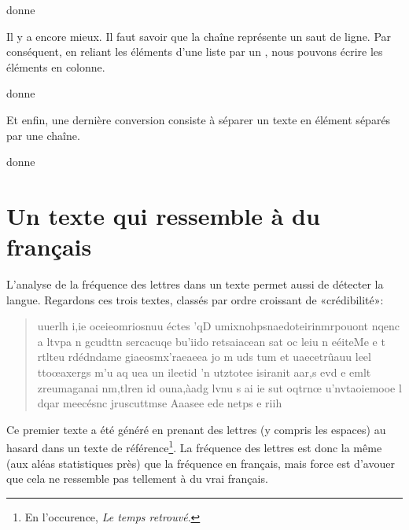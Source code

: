 


donne





Il y a encore mieux. Il faut savoir que la chaîne  représente un saut de ligne. Par conséquent, en reliant les éléments d'une liste par un , nous pouvons écrire les éléments en colonne. 



donne



Et enfin, une dernière conversion consiste à séparer un texte en élément séparés par une chaîne. 



donne





\section{Un texte qui ressemble à du français}

L'analyse de la fréquence des lettres dans un texte permet aussi de détecter la langue. Regardons ces trois textes, classés par ordre croissant de «crédibilité»:

\begin{quote}
    uuerlh i,ie oceieomriosnuu éctes 'qD umixnohpsnaedoteirinmrpouont nqenc a ltvpa n gcudttn  sercacuqe bu'iido retsaiacean sat oc leiu n  eéiteMe e   t  rtlteu rdédndame giaeosmx'raeaeea  jo m uds tum   et uaecetrûauu leel ttoœaxergs m'u aq uea un ileetid 'n utztotee isiranit aar,s evd e emlt zreumaganai nm,tlren id ouna,àadg lvnu s ai ie sut oqtrnœ u'nvtaoiemooe l  dqar meecésnc  jruscuttmse Aaasee ede netps  e riih
\end{quote}
Ce premier texte a été généré en prenant des lettres (y compris les espaces) au hasard dans un texte de référence\footnote{En l'occurence, \emph{Le temps retrouvé}.}. La fréquence des lettres est donc la même (aux aléas statistiques près) que la fréquence en français, mais force est d'avouer que cela ne ressemble pas tellement à du vrai français.
 
